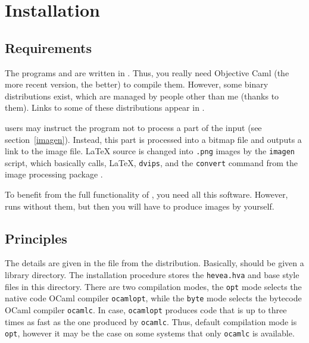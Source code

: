 \section{Installation}

\subsection{Requirements}\label{requirements}
The programs  and  are written in
. Thus, you
really need Objective Caml (the more recent version, the better) to
compile them.
However, some binary distributions exist, which are managed by
people other than me (thanks to them).
Links to some of these distributions appear in .

\label{imagen:needs}\hevea{} users may instruct the program not to process a
part of the input (see section~\ref{imagen}). Instead, this part is
processed into a  bitmap file and \hevea{} outputs a  link to the image file.
\LaTeX{} source is changed into \verb+.png+ images by the \verb+imagen+
script, which basically calls, \LaTeX, \texttt{dvips},
and the \texttt{convert} command from the image processing package
.

To benefit from the full functionality of \hevea, you need all
this software. However, \hevea{} runs without them, but then you will
have to produce images by yourself.

\subsection{Principles}
The details are given in the 
file from the distribution.
Basically, \hevea{} should be given a library
directory. The installation procedure stores the \texttt{hevea.hva}
and base style files in this directory.
There are two compilation modes, the \texttt{opt} mode selects the
native code  OCaml compiler \texttt{ocamlopt}, while the \texttt{byte}
mode selects the bytecode  OCaml compiler \texttt{ocamlc}.
In \hevea{} case, \texttt{ocamlopt} produces code that is up to three
times as fast as the one produced by \texttt{ocamlc}.
Thus, default compilation mode is \texttt{opt}, however it may be the
case on some systems that only \texttt{ocamlc} is available.

